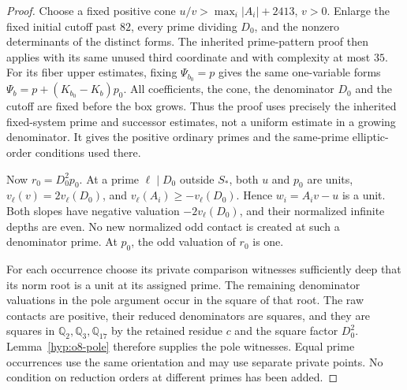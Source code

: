 \documentclass[11pt]{article}
\theoremstyle{definition}
\theoremstyle{remark}
\newcommand{\Q}{\mathbb Q}
\begin{document}
\begin{proof}
Choose a fixed positive cone
$u/v>\max_i|A_i|+2413$, $v>0$. Enlarge the fixed initial cutoff past
$82$, every prime dividing $D_0$, and the nonzero determinants of the
distinct forms. The inherited prime-pattern proof then applies with its
same unused third coordinate and with complexity at most $35$.
For its fiber upper estimates, fixing $\Psi_{b_0}=p$ gives the same
one-variable forms
$\Psi_b=p+(K_{b_0}-K_b)p_0$.
All coefficients, the cone, the denominator $D_0$ and the cutoff are
fixed before the box grows. Thus the proof uses precisely the inherited
fixed-system prime and successor estimates, not a uniform estimate in a
growing denominator. It gives the positive ordinary primes and the
same-prime elliptic-order conditions used there.

Now $r_0=D_0^2p_0$. At a prime $\ell\mid D_0$ outside $S_*$, both $u$
and $p_0$ are units, $v_\ell(v)=2v_\ell(D_0)$, and
$v_\ell(A_i)\ge-v_\ell(D_0)$. Hence $w_i=A_iv-u$ is a unit.
Both slopes have negative valuation $-2v_\ell(D_0)$, and their normalized
infinite depths are even. No new normalized odd contact is created at
such a denominator prime. At $p_0$, the odd valuation of $r_0$ is one.

For each occurrence choose its private comparison witnesses sufficiently
deep that its norm root is a unit at its assigned prime. The remaining
denominator valuations in the pole argument occur in the square of that
root. The raw contacts are positive, their reduced denominators are
squares, and they are squares in $\Q_2,\Q_3,\Q_{17}$ by the retained
residue $c$ and the square factor $D_0^2$. Lemma~\ref{hyp:o8-pole}
therefore supplies the pole witnesses. Equal prime occurrences use the
same orientation and may use separate private points. No condition on
reduction orders at different primes has been added.
\end{proof}
\end{document}
